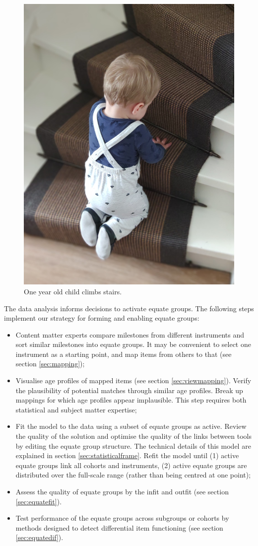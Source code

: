 \documentclass[
]{book}
\providecommand{\tightlist}{%
  \setlength{\itemsep}{0pt}\setlength{\parskip}{0pt}}
\begin{document}
\begin{figure}

{\centering \includegraphics[width=0.5\linewidth]{fig/otis-stairs} 

}

\caption{One year old child climbs stairs.}\label{fig:stairpic}
\end{figure}



The data analysis informs decisions to activate equate groups. The following steps implement our strategy for forming and enabling equate groups:

\begin{itemize}
\tightlist
\item
  Content matter experts compare milestones from different instruments and sort similar milestones into equate groups. It may be convenient to select one instrument as a starting point, and map items from others to that (see section \ref{sec:mapping});
\item
  Visualise age profiles of mapped items (see section \ref{sec:viewmapping}). Verify the plausibility of potential matches through similar age profiles. Break up mappings for which age profiles appear implausible. This step requires both statistical and subject matter expertise;
\item
  Fit the model to the data using a subset of equate groups as active. Review the quality of the solution and optimise the quality of the links between tools by editing the equate group structure. The technical details of this model are explained in section \ref{sec:statisticalframe}. Refit the model until (1) active equate groups link all cohorts and instruments, (2) active equate groups are distributed over the full-scale range (rather than being centred at one point);
\item
  Assess the quality of equate groups by the infit and outfit (see section \ref{sec:equatefit}).
\item
  Test performance of the equate groups across subgroups or cohorts by methods designed to detect differential item functioning (see section \ref{sec:equatedif}).
\end{itemize}
\end{document}
